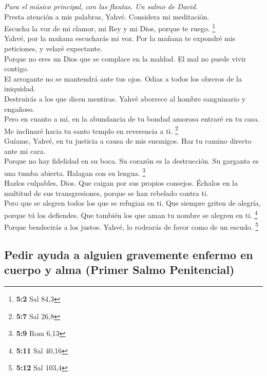 \emph{Para el músico principal, con las flautas. Un salmo de David.}\\
 Presta atención a mis palabras, Yahvé. Considera mi
meditación.\\
 Escucha la voz de mi clamor, mi Rey y mi Dios, porque te
ruego. \footnote{\textbf{5:2} Sal 84,3}\\
 Yahvé, por la mañana escucharás mi voz. Por la mañana te
expondré mis peticiones, y velaré expectante.\\
 Porque no eres un Dios que se complace en la maldad. El
mal no puede vivir contigo.\\
 El arrogante no se mantendrá ante tus ojos. Odias a todos
los obreros de la iniquidad.\\
 Destruirás a los que dicen mentiras. Yahvé aborrece al
hombre sanguinario y engañoso.\\
 Pero en cuanto a mí, en la abundancia de tu bondad
amorosa entraré en tu casa. Me inclinaré hacia tu santo templo en
reverencia a ti. \footnote{\textbf{5:7} Sal 26,8}\\
 Guíame, Yahvé, en tu justicia a causa de mis enemigos.
Haz tu camino directo ante mi cara.\\
 Porque no hay fidelidad en su boca. Su corazón es la
destrucción. Su garganta es una tumba abierta. Halagan con su lengua.
\footnote{\textbf{5:9} Rom 6,13}\\
 Hazlos culpables, Dios. Que caigan por sus propios
consejos. Échalos en la multitud de sus transgresiones, porque se han
rebelado contra ti.\\
 Pero que se alegren todos los que se refugian en ti. Que
siempre griten de alegría, porque tú los defiendes. Que también los que
aman tu nombre se alegren en ti. \footnote{\textbf{5:11} Sal 40,16}\\
 Porque bendecirás a los justos. Yahvé, lo rodearás de
favor como de un escudo. \footnote{\textbf{5:12} Sal 103,4}

\hypertarget{pedir-ayuda-a-alguien-gravemente-enfermo-en-cuerpo-y-alma-primer-salmo-penitencial}{%
\subsection{Pedir ayuda a alguien gravemente enfermo en cuerpo y alma
(Primer Salmo
Penitencial)}\label{pedir-ayuda-a-alguien-gravemente-enfermo-en-cuerpo-y-alma-primer-salmo-penitencial}}


